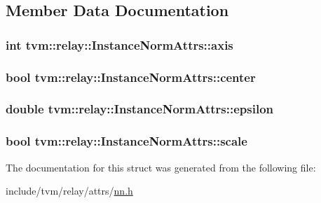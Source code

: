 \subsection{Member Data Documentation}
\subsubsection[{\texorpdfstring{axis}{axis}}]{\setlength{\rightskip}{0pt plus 5cm}int tvm\+::relay\+::\+Instance\+Norm\+Attrs\+::axis}\hypertarget{structtvm_1_1relay_1_1InstanceNormAttrs_a09f0653a402bc92dd539737bac6812e4}{}\label{structtvm_1_1relay_1_1InstanceNormAttrs_a09f0653a402bc92dd539737bac6812e4}
\subsubsection[{\texorpdfstring{center}{center}}]{\setlength{\rightskip}{0pt plus 5cm}bool tvm\+::relay\+::\+Instance\+Norm\+Attrs\+::center}\hypertarget{structtvm_1_1relay_1_1InstanceNormAttrs_af8c9c7c50567f50cd6e7e21721a11532}{}\label{structtvm_1_1relay_1_1InstanceNormAttrs_af8c9c7c50567f50cd6e7e21721a11532}
\subsubsection[{\texorpdfstring{epsilon}{epsilon}}]{\setlength{\rightskip}{0pt plus 5cm}double tvm\+::relay\+::\+Instance\+Norm\+Attrs\+::epsilon}\hypertarget{structtvm_1_1relay_1_1InstanceNormAttrs_ace912a18c84c320ad30389ed2faf5904}{}\label{structtvm_1_1relay_1_1InstanceNormAttrs_ace912a18c84c320ad30389ed2faf5904}
\subsubsection[{\texorpdfstring{scale}{scale}}]{\setlength{\rightskip}{0pt plus 5cm}bool tvm\+::relay\+::\+Instance\+Norm\+Attrs\+::scale}\hypertarget{structtvm_1_1relay_1_1InstanceNormAttrs_a3c3ea1bc3de46864e1a355711ac7d2a1}{}\label{structtvm_1_1relay_1_1InstanceNormAttrs_a3c3ea1bc3de46864e1a355711ac7d2a1}


The documentation for this struct was generated from the following file\+:\begin{DoxyCompactItemize}
\item 
include/tvm/relay/attrs/\hyperlink{include_2tvm_2relay_2attrs_2nn_8h}{nn.\+h}\end{DoxyCompactItemize}
